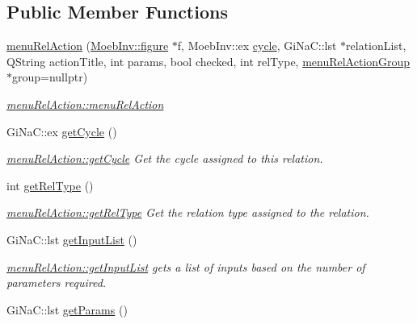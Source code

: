 \subsection*{Public Member Functions}
\begin{DoxyCompactItemize}
\item 
\mbox{\hyperlink{classmenu_rel_action_a2db14a6cd576e8cb645a0e1dcf584d4e}{menu\+Rel\+Action}} (\mbox{\hyperlink{class_moeb_inv_1_1figure}{Moeb\+Inv\+::figure}} $\ast$f, Moeb\+Inv\+::ex \mbox{\hyperlink{class_moeb_inv_1_1cycle}{cycle}}, Gi\+Na\+C\+::lst $\ast$relation\+List, Q\+String action\+Title, int params, bool checked, int rel\+Type, \mbox{\hyperlink{classmenu_rel_action_group}{menu\+Rel\+Action\+Group}} $\ast$group=nullptr)
\begin{DoxyCompactList}\small\item\em \mbox{\hyperlink{classmenu_rel_action_a2db14a6cd576e8cb645a0e1dcf584d4e}{menu\+Rel\+Action\+::menu\+Rel\+Action}} \end{DoxyCompactList}\item 
Gi\+Na\+C\+::ex \mbox{\hyperlink{classmenu_rel_action_acb80ac433c901f22dbddcff7445adf24}{get\+Cycle}} ()
\begin{DoxyCompactList}\small\item\em \mbox{\hyperlink{classmenu_rel_action_acb80ac433c901f22dbddcff7445adf24}{menu\+Rel\+Action\+::get\+Cycle}} Get the cycle assigned to this relation. \end{DoxyCompactList}\item 
int \mbox{\hyperlink{classmenu_rel_action_a1092ced0a224fdb4c8f5a0b12548a120}{get\+Rel\+Type}} ()
\begin{DoxyCompactList}\small\item\em \mbox{\hyperlink{classmenu_rel_action_a1092ced0a224fdb4c8f5a0b12548a120}{menu\+Rel\+Action\+::get\+Rel\+Type}} Get the relation type assigned to the relation. \end{DoxyCompactList}\item 
Gi\+Na\+C\+::lst \mbox{\hyperlink{classmenu_rel_action_a8ec0134231f519695901fa4d750fab4a}{get\+Input\+List}} ()
\begin{DoxyCompactList}\small\item\em \mbox{\hyperlink{classmenu_rel_action_a8ec0134231f519695901fa4d750fab4a}{menu\+Rel\+Action\+::get\+Input\+List}} gets a list of inputs based on the number of parameters required. \end{DoxyCompactList}\item 
Gi\+Na\+C\+::lst \mbox{\hyperlink{classmenu_rel_action_a8da5cc4f4063d4ea465d67b0aabc57e7}{get\+Params}} ()

\end{DoxyCompactItemize}
